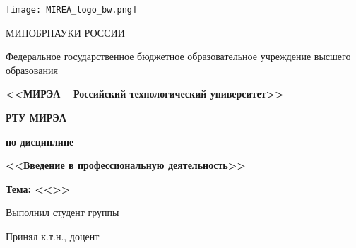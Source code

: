 
\begin{titlepage}
	\begin{center}
		\texttt{[image: MIREA\_logo\_bw.png]}
		
		\hfill \break
		{\small МИНОБРНАУКИ РОССИИ}
		
		Федеральное государственное бюджетное образовательное учреждение высшего образования
		
		\textbf{<<МИРЭА – Российский технологический университет>>}
		
		\textbf{РТУ МИРЭА}
				
		\hfill \break
		
		\makeatletter		
		\ifdefined\@institution
		\@institution
		\fi
		
		\ifdefined\@faculty
		\textbf{\@faculty}
		\fi
		
		\hfill \break
				
		\ifdefined\@worktype
		\textbf{\@worktype{ }по дисциплине}
		\fi
		
		\textbf{<<Введение в профессиональную деятельность>>}

		\hfill \break

		\ifdefined\@topic						
		\textbf{Тема: <<\@topic>>}
		\fi
		
		\vfill
		
		\ifdefined\@author
		Выполнил студент
			\ifdefined\@group
			группы \@group
			\fi
		\hfill \@author \\
		\fi
		
		\ifdefined\@examiner
		\hfill \break
		Принял к.т.н., доцент \hfill \@examiner \\
		\fi
		\makeatother
		
		\vspace{1.3cm}
		
		\thispagestyle{titlepagefooter}
	\end{center}
	\clearpage
\end{titlepage}
